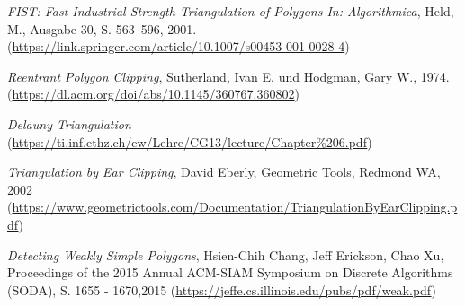 \begin{thebibliography}{11}
    \emph{FIST: Fast Industrial-Strength Triangulation of Polygons In: Algorithmica}, Held, M., Ausgabe 30, S. 563–596, 2001.
    (\href{https://link.springer.com/article/10.1007/s00453-001-0028-4}{https://link.springer.com/article/10.1007/s00453-001-0028-4})
    
    \emph{Reentrant Polygon Clipping}, Sutherland, Ivan E. und Hodgman, Gary W., 1974. \break
    (\href{https://dl.acm.org/doi/abs/10.1145/360767.360802}{https://dl.acm.org/doi/abs/10.1145/360767.360802})

    \emph{Delauny Triangulation} \break
    (\href{https://ti.inf.ethz.ch/ew/Lehre/CG13/lecture/Chapter%206.pdf}{https://ti.inf.ethz.ch/ew/Lehre/CG13/lecture/Chapter\%206.pdf})

    \emph{Triangulation by Ear Clipping}, David Eberly, Geometric Tools, Redmond WA, 2002 \break
    (\href{https://www.geometrictools.com/Documentation/TriangulationByEarClipping.pdf}{https://www.geometrictools.com/Documentation/TriangulationByEarClipping.pdf})

    \emph{Detecting Weakly Simple Polygons}, Hsien-Chih Chang, Jeff Erickson, Chao Xu, Proceedings of the 2015 Annual ACM-SIAM Symposium on Discrete Algorithms (SODA), S. 1655 - 1670,2015\break
    (\href{https://jeffe.cs.illinois.edu/pubs/pdf/weak.pdf}{https://jeffe.cs.illinois.edu/pubs/pdf/weak.pdf})
\end{thebibliography}